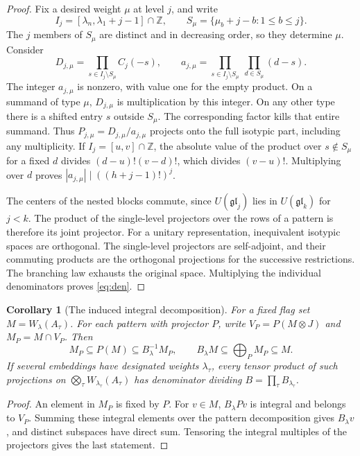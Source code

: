 \documentclass[a4paper,11pt]{article}
\newtheorem{corollary}[proposition]{Corollary}
\theoremstyle{definition}
\theoremstyle{remark}
\newcommand{\ZZ}{\mathbb Z}\newcommand{\ord}{\operatorname{ord}}
\numberwithin{equation}{section}
\begin{document}
\begin{proof}
Fix a desired weight \(\mu\) at level \(j\), and write
\[
 I_j=[\lambda_n,\lambda_1+j-1]\cap\ZZ,\qquad
 S_\mu=\{\mu_b+j-b:1\le b\le j\}.
\]
The \(j\) members of \(S_\mu\) are distinct and in decreasing order, so they determine \(\mu\). Consider
\begin{equation}
 D_{j,\mu}=\prod_{s\in I_j\setminus S_\mu}C_j(-s),\qquad
 a_{j,\mu}=\prod_{s\in I_j\setminus S_\mu}\ \prod_{d\in S_\mu}(d-s).
 \label{eq:sieve}
\end{equation}
The integer \(a_{j,\mu}\) is nonzero, with value one for the empty product. On a summand of type \(\mu\), \(D_{j,\mu}\) is multiplication by this integer. On any other type there is a shifted entry \(s\) outside \(S_\mu\). The corresponding factor kills that entire summand. Thus \(P_{j,\mu}=D_{j,\mu}/a_{j,\mu}\) projects onto the full isotypic part, including any multiplicity. If \(I_j=[u,v]\cap\ZZ\), the absolute value of the product over \(s\notin S_\mu\) for a fixed \(d\) divides \((d-u)!(v-d)!\), which divides \((v-u)!\). Multiplying over \(d\) proves \(|a_{j,\mu}|\mid((h+j-1)!)^j\).

The centers of the nested blocks commute, since \(U(\mathfrak{gl}_j)\) lies in \(U(\mathfrak{gl}_k)\) for \(j<k\). The product of the single-level projectors over the rows of a pattern is therefore its joint projector. For a unitary representation, inequivalent isotypic spaces are orthogonal. The single-level projectors are self-adjoint, and their commuting products are the orthogonal projections for the successive restrictions. The branching law exhausts the original space. Multiplying the individual denominators proves \eqref{eq:den}.
\end{proof}

\begin{corollary}[The induced integral decomposition]\label{cor:sandwich}
For a fixed flag set \(M=W_\lambda(A_\tau)\). For each pattern with projector \(P\), write \(V_P=P(M\otimes J)\) and \(M_P=M\cap V_P\). Then
\[
       M_P\subseteq P(M)\subseteq B_\lambda^{-1}M_P,\qquad
       B_\lambda M\subseteq\bigoplus_P M_P\subseteq M .
\]
If several embeddings have designated weights \(\lambda_\tau\), every tensor product of such projections on \(\bigotimes_\tau W_{\lambda_\tau}(A_\tau)\) has denominator dividing \(B=\prod_\tau B_{\lambda_\tau}\).
\end{corollary}
\begin{proof}
An element in \(M_P\) is fixed by \(P\). For \(v\in M\), \(B_\lambda P v\) is integral and belongs to \(V_P\). Summing these integral elements over the pattern decomposition gives \(B_\lambda v\), and distinct subspaces have direct sum. Tensoring the integral multiples of the projectors gives the last statement.
\end{proof}
\end{document}
